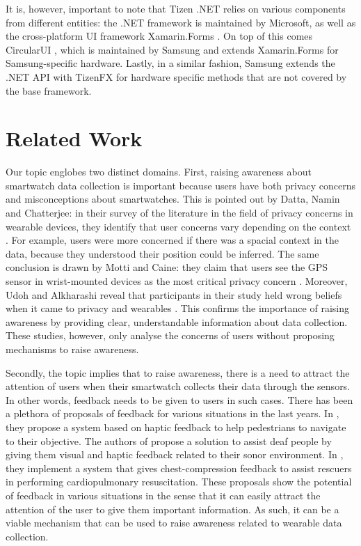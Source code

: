 \documentclass[conference, a4paper, 10pt, twocolumn]{IEEEtran}
\begin{document}
It is, however, important to note that Tizen .NET relies on various components from different entities: the .NET framework \cite{dotnet} is maintained by Microsoft, as well as the cross-platform \ac{UI} framework Xamarin.Forms \cite{xamarin}. On top of this comes CircularUI \cite{circularUI}, which is maintained by Samsung and extends Xamarin.Forms for Samsung-specific hardware. Lastly, in a similar fashion, Samsung extends the .NET \ac{API} with TizenFX \cite{tizenFX} for hardware specific methods that are not covered by the base framework.

\section{Related Work}\label{related}
Our topic englobes two distinct domains. First, raising awareness about smartwatch data collection is important because users have both privacy concerns and misconceptions about smartwatches. This is pointed out by Datta, Namin and Chatterjee: in their survey of the literature in the field of privacy concerns in wearable devices, they identify that user concerns vary depending on the context \cite{datta2018survey}. For example, users were more concerned if there was a spacial context in the data, because they understood their position could be inferred. The same conclusion is drawn by Motti and Caine: they claim that users see the GPS sensor in wrist-mounted devices as the most critical privacy concern \cite{motti2015users}. Moreover, Udoh and Alkharashi reveal that participants in their study held wrong beliefs when it came to privacy and wearables \cite{udoh2016privacy}. This confirms the importance of raising awareness by providing clear, understandable information about data collection. These studies, however, only analyse the concerns of users without proposing mechanisms to raise awareness.

Secondly, the topic implies that to raise awareness, there is a need to attract the attention of users when their smartwatch collects their data through the sensors. In other words, feedback needs to be given to users in such cases. There has been a plethora of proposals of feedback for various situations in the last years. In \cite{dobbelstein2016unconstrained}, they propose a system based on haptic feedback to help pedestrians to navigate to their objective. The authors of \cite{goodman2020evaluating} propose a solution to assist deaf people by giving them visual and haptic feedback related to their sonor environment. In \cite{lee2019smartwatch}, they implement a system that gives chest-compression feedback to assist rescuers in performing cardiopulmonary resuscitation. These proposals show the potential of feedback in various situations in the sense that it can easily attract the attention of the user to give them important information. As such, it can be a viable mechanism that can be used to raise awareness related to wearable data collection.
\end{document}
